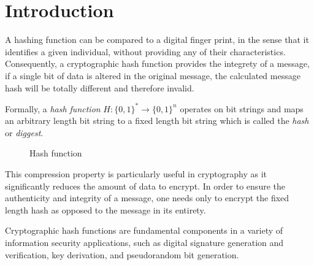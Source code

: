\chapter*{Introduction}
A hashing function can be compared to a digital finger print, in the sense that it identifies a given individual, without providing any of their characteristics. Consequently, a cryptographic hash function provides the integrety of a message, if a single bit of data is altered in the original message, the calculated message hash will be totally different and therefore invalid.

Formally, a \emph{hash function} $H:{\{0,1\}}^* \rightarrow {\{0,1\}}^n$ operates on bit strings and maps an arbitrary length bit string to a fixed length bit string which is called the \emph{hash} or \emph{diggest}.

\begin{figure}[!ht]
\centering
{}
\caption{\label{fig:hachage}Hash function}
\end{figure}

This compression property is particularly useful in cryptography as it significantly reduces the amount of data to encrypt. In order to ensure the authenticity and integrity of a message, one needs only to encrypt the fixed length hash as opposed to the message in its entirety.

Cryptographic hash functions are fundamental components in a variety of information security applications, such as digital signature generation and verification, key derivation, and pseudorandom bit generation.

